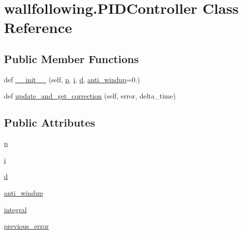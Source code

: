 \hypertarget{classwallfollowing_1_1_p_i_d_controller}{}\section{wallfollowing.\+P\+I\+D\+Controller Class Reference}
\label{classwallfollowing_1_1_p_i_d_controller}
\subsection*{Public Member Functions}
\begin{DoxyCompactItemize}
\item 
def \hyperlink{classwallfollowing_1_1_p_i_d_controller_a1fcf8044594436293cfe4f43b2d27a3a}{\+\_\+\+\_\+init\+\_\+\+\_\+} (self, \hyperlink{classwallfollowing_1_1_p_i_d_controller_adf238faaf65562d4441c773ca3354419}{p}, \hyperlink{classwallfollowing_1_1_p_i_d_controller_a9ce833d41fb41cb18da5f0a6e9801d6d}{i}, \hyperlink{classwallfollowing_1_1_p_i_d_controller_af054e460466332038060384f50d71fd0}{d}, \hyperlink{classwallfollowing_1_1_p_i_d_controller_a69f5b163b3b0342dfa5335429340bd2d}{anti\+\_\+windup}=0.)
\item 
def \hyperlink{classwallfollowing_1_1_p_i_d_controller_a8f21bfcfad4e6ee4f02da23222144df7}{update\+\_\+and\+\_\+get\+\_\+correction} (self, error, delta\+\_\+time)
\end{DoxyCompactItemize}
\subsection*{Public Attributes}
\begin{DoxyCompactItemize}
\item 
\hyperlink{classwallfollowing_1_1_p_i_d_controller_adf238faaf65562d4441c773ca3354419}{p}
\item 
\hyperlink{classwallfollowing_1_1_p_i_d_controller_a9ce833d41fb41cb18da5f0a6e9801d6d}{i}
\item 
\hyperlink{classwallfollowing_1_1_p_i_d_controller_af054e460466332038060384f50d71fd0}{d}
\item 
\hyperlink{classwallfollowing_1_1_p_i_d_controller_a69f5b163b3b0342dfa5335429340bd2d}{anti\+\_\+windup}
\item 
\hyperlink{classwallfollowing_1_1_p_i_d_controller_a74688f80d715258ecf5f8b4823a1760f}{integral}
\item 
\hyperlink{classwallfollowing_1_1_p_i_d_controller_a8f880f52e6d6f020769ab01d6459c908}{previous\+\_\+error}
\end{DoxyCompactItemize}


